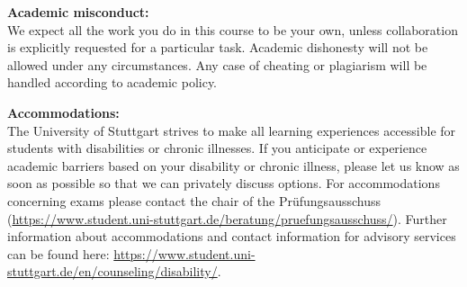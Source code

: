 \documentclass[11pt,fleqn,a4]{article}
\newcommand{\6}{\mbox{$[\hspace*{-.6mm}[$}}
\newcommand{\9}{\mbox{$]\hspace*{-.6mm}]$}}
\begin{document}
\bigskip

%
%
%
%

%
%


{\bf Academic misconduct:}
\\
We expect all the work you do in this course to be your own, unless
collaboration is explicitly requested for a particular task. Academic dishonesty will not be
allowed under any circumstances. Any case of cheating or plagiarism
will be handled according to academic policy.

{\bf Accommodations:}
\\
The University of Stuttgart strives to make all learning experiences accessible for students with disabilities or chronic illnesses. If you anticipate or experience academic barriers based on your disability or chronic illness, please let us know as soon as possible so that we can privately discuss options. For accommodations concerning exams please contact the chair of the Pr\"{u}fungsausschuss (\url{https://www.student.uni-stuttgart.de/beratung/pruefungsausschuss/}). Further information about accommodations and contact information for advisory services can be found here: \url{https://www.student.uni-stuttgart.de/en/counseling/disability/}.






\end{document}
